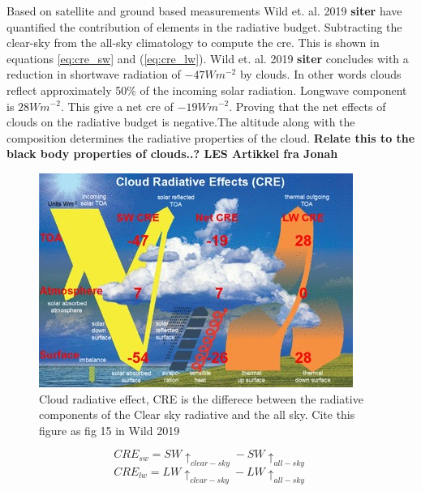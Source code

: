 Based on satellite and ground based measurements Wild et. al. 2019 \textbf{siter} have quantified the contribution of elements in the radiative budget. Subtracting the clear-sky from the all-sky climatology to compute the \acrfull{cre}. This is shown in equations \eqref{eq:cre_sw} and (\ref{eq:cre_lw}). Wild et. al. 2019 \textbf{siter} concludes with a reduction in shortwave radiation of $-47Wm^{-2}$ by clouds. In other words clouds reflect approximately 50\% of the incoming solar radiation. Longwave component is $28Wm^{-2}$. This give a net \acrshort{cre} of $-19Wm^{-2}$. Proving that the net effects of clouds on the radiative budget is negative.The altitude along with the composition determines the radiative properties of the cloud. \textbf{Relate this to the black body properties of clouds..? LES Artikkel fra Jonah}
\begin{figure}[h]
    \centering
    \includegraphics[scale = 7]{Chapter1_Intro/images/CRE_wild2019.jpg}
    \caption{Cloud radiative effect, CRE is the differece between the radiative components of the Clear sky radiative and the all sky. Cite this figure as fig 15 in Wild 2019}
    \label{fig:cre}
\end{figure}

\begin{equation} \label{eq:cre_sw}
    CRE_{sw} = SW\uparrow_{clear-sky} - SW\uparrow_{all-sky}
\end{equation}
\begin{equation} \label{eq:cre_lw}
    CRE_{lw} = LW\uparrow_{clear-sky} - LW\uparrow_{all-sky}
\end{equation}

